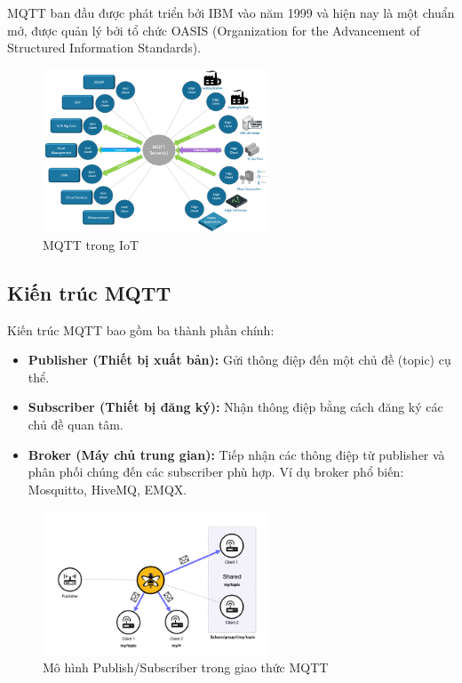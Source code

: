 MQTT ban đầu được phát triển bởi IBM vào năm 1999 và hiện nay là một chuẩn mở, được quản lý bởi tổ chức OASIS (Organization for the Advancement of Structured Information Standards).
\begin{figure}[H]
  \centering
  \includegraphics[width=0.6\textwidth]{Images/MQTT-trong-IoT.png}
  \caption{MQTT trong IoT}
\end{figure}
\subsection{Kiến trúc MQTT}

Kiến trúc MQTT bao gồm ba thành phần chính:

\begin{itemize}
    \item \textbf{Publisher (Thiết bị xuất bản):} Gửi thông điệp đến một chủ đề (topic) cụ thể.
    \item \textbf{Subscriber (Thiết bị đăng ký):} Nhận thông điệp bằng cách đăng ký các chủ đề quan tâm.
    \item \textbf{Broker (Máy chủ trung gian):} Tiếp nhận các thông điệp từ publisher và phân phối chúng đến các subscriber phù hợp. Ví dụ broker phổ biến: Mosquitto, HiveMQ, EMQX.
\end{itemize}
\begin{figure}[H]
  \centering
  \includegraphics[width=0.6\textwidth]{Images/mo-hinh-mqtt.png}
  \caption{Mô hình Publish/Subscriber trong giao thức MQTT}
\end{figure}
